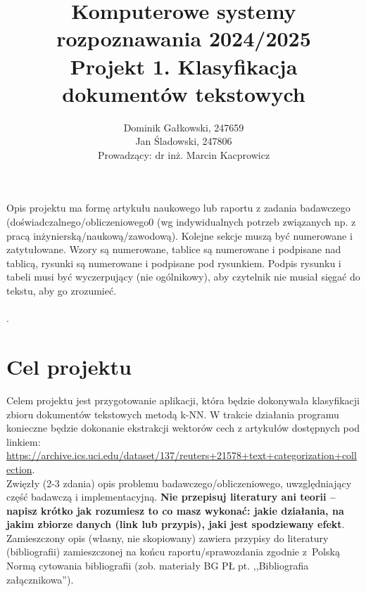 \documentclass{article}
\author{
	{Dominik Gałkowski, 247659} \\
	{Jan Śladowski, 247806}\\ 
{Prowadzący: dr inż. Marcin Kacprowicz}
}
\title{Komputerowe systemy rozpoznawania 2024/2025\\Projekt 1. Klasyfikacja dokumentów tekstowych}
\begin{document}
\maketitle

Opis projektu ma formę artykułu naukowego lub raportu z zadania
badawczego (doświadczalnego/obliczeniowego0 (wg indywidualnych potrzeb związanych np. z
pracą inżynierską/naukową/zawodową). Kolejne sekcje muszą być numerowane i
zatytułowane. Wzory są numerowane, tablice są numerowane i podpisane nad
tablicą, rysunki są numerowane i podpisane pod rysunkiem. Podpis rysunku i
tabeli musi być wyczerpujący (nie ogólnikowy), aby czytelnik nie musiał sięgać do tekstu, aby go
zrozumieć.\\
\\
. 

\section{Cel projektu}
\indent Celem projektu jest przygotowanie aplikacji, która będzie dokonywała klasyfikacji zbioru dokumentów tekstowych metodą k-NN. W trakcie działania programu konieczne będzie dokonanie ekstrakcji wektorów cech z artykułów dostępnych pod linkiem: 
\url{https://archive.ics.uci.edu/dataset/137/reuters+21578+text+categorization+collection}. \\
\indent Zwięzły (2-3 zdania) opis
problemu badawczego/obliczeniowego,  uwzględniający część badawczą i
implementacyjną. {\bf Nie przepisuj literatury ani teorii -- napisz krótko jak
rozumiesz to co masz wykonać: jakie działania, na jakim zbiorze danych (link lub
przypis), jaki jest spodziewany efekt}.\\
\indent Zamieszczony opis (własny, nie skopiowany) zawiera
przypisy do literatury (bibliografii) zamieszczonej na końcu raportu/sprawozdania
zgodnie z~Polską Normą cytowania bibliografii (zob. materiały BG PŁ pt. ,,Bibliografia
załącznikowa'').\\
\end{document}
